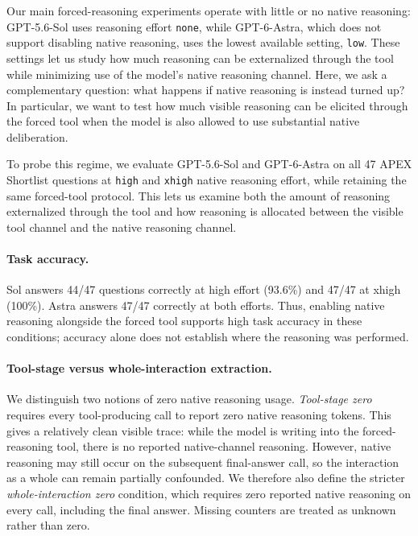 Our main forced-reasoning experiments operate with little or no native reasoning:
GPT-5.6-Sol uses reasoning effort \texttt{none}, while GPT-6-Astra, which does
not support disabling native reasoning, uses the lowest available setting,
\texttt{low}. These settings let us study how much reasoning can be externalized
through the tool while minimizing use of the model's native reasoning channel.
Here, we ask a complementary question: what happens if native reasoning is
instead turned up? In particular, we want to test how much visible reasoning
can be elicited through the forced tool when the model is also allowed to use
substantial native deliberation.

To probe this regime, we evaluate GPT-5.6-Sol and GPT-6-Astra on all 47 APEX
Shortlist questions at \texttt{high} and \texttt{xhigh} native reasoning effort,
while retaining the same forced-tool protocol. This lets us examine both the amount of reasoning
externalized through the tool and how reasoning is allocated between the
visible tool channel and the native reasoning channel.


\paragraph{Task accuracy.}
Sol answers 44/47 questions correctly at high effort (93.6\%) and 47/47 at xhigh (100\%). Astra answers 47/47 correctly at both efforts.
Thus, enabling native reasoning alongside the forced tool supports high task accuracy in these conditions; accuracy alone does not establish where the reasoning was performed.

\paragraph{Tool-stage versus whole-interaction extraction.}
We distinguish two notions of zero native reasoning usage.
\emph{Tool-stage zero} requires every tool-producing call to report zero native
reasoning tokens. This gives a relatively clean visible trace: while the model is
writing into the forced-reasoning tool, there is no reported native-channel
reasoning. However, native reasoning may still occur on the subsequent
final-answer call, so the interaction as a whole can remain partially confounded.
We therefore also define the stricter \emph{whole-interaction zero} condition,
which requires zero reported native reasoning on every call, including the final
answer. Missing counters are treated as unknown rather than zero.

